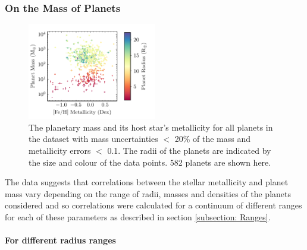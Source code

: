 \documentclass[a4paper,twocolumn,12pt]{article}
\begin{document}





\subsubsection{On the Mass of Planets}

\begin{figure}[h!]
    \centering
    \includegraphics[width=0.5\textwidth]{Graphs/FeH vs Mass Planet Plot.pdf}
    \caption{The planetary mass and its host star's metallicity for all planets in the dataset with mass uncertainties $<$ 20\% of the mass and metallicity errors $<$ 0.1. The radii of the planets are indicated by the size and colour of the data points. 582 planets are shown here.}
    \label{figure: Fe/H vs Mass parameter plot}
\end{figure}

The data suggests that correlations between the stellar metallicity and planet mass vary depending on the range of radii, masses and densities of the planets considered and so correlations were calculated for a continuum of different ranges for each of these parameters as described in section \ref{subsection: Ranges}.


\paragraph{For different radius ranges}
\vspace{-1em}
\end{document}

